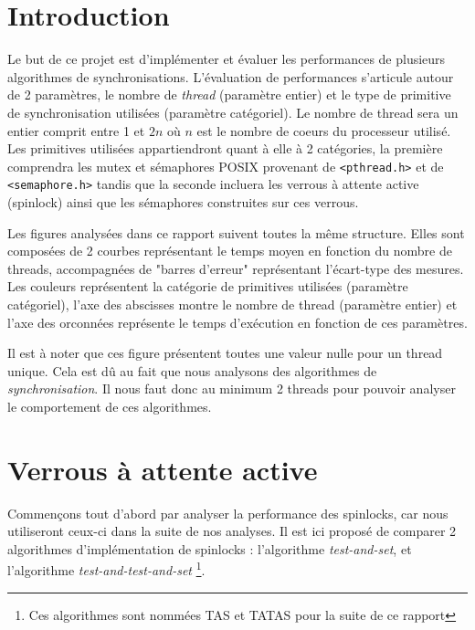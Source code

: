 





\maketitle
\newpage

\section{Introduction}

Le but de ce projet est d'implémenter et évaluer les performances de plusieurs algorithmes de synchronisations.
L'évaluation de performances s'articule autour de 2 paramètres, le nombre de \textit{thread} (paramètre entier) et le type de primitive de synchronisation utilisées (paramètre catégoriel).
Le nombre de thread sera un entier comprit entre 1 et $2n$ où $n$ est le nombre de coeurs du processeur utilisé.
Les primitives utilisées appartiendront quant à elle à 2 catégories, la première comprendra les mutex et sémaphores POSIX provenant de \texttt{<pthread.h>} et de \texttt{<semaphore.h>} tandis que la seconde incluera les verrous à attente active (spinlock) ainsi que les sémaphores construites sur ces verrous.

Les figures analysées dans ce rapport suivent toutes la même structure. Elles sont composées de 2 courbes représentant le temps moyen en fonction du nombre de threads, accompagnées de "barres d'erreur" représentant l'écart-type des mesures.
Les couleurs représentent la catégorie de primitives utilisées (paramètre catégoriel), l'axe des abscisses montre le nombre de thread (paramètre entier) et l'axe des orconnées représente le temps d'exécution en fonction de ces paramètres.

Il est à noter que ces figure présentent toutes une valeur nulle pour un thread unique. Cela est dû au fait que nous analysons des algorithmes de \textit{synchronisation}.
Il nous faut donc au minimum 2 threads pour pouvoir analyser le comportement de ces algorithmes.

\section{Verrous à attente active}

Commençons tout d'abord par analyser la performance des spinlocks, car nous utiliseront ceux-ci dans la suite de nos analyses. Il est ici proposé de comparer
2 algorithmes d'implémentation de spinlocks : l'algorithme \textit{test-and-set}, et l'algorithme \textit{test-and-test-and-set} \footnote{Ces algorithmes sont nommées TAS et TATAS pour la suite de ce rapport}.

